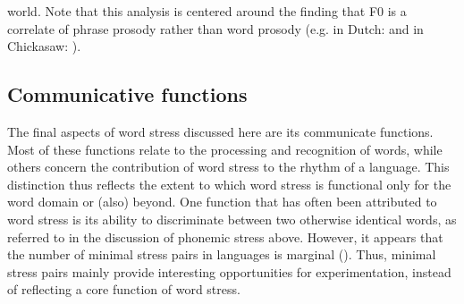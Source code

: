 world. Note that this analysis is centered around the finding that F0 is a correlate of phrase prosody rather than word prosody (e.g. in Dutch: \citealt{sluijter_spectral_1996} and in Chickasaw: \citealt{gordon_intonational_2005}).

\subsection{Communicative functions} \label{sec114}
The final aspects of word stress discussed here are its communicate functions. Most of these functions relate to the processing and recognition of words, while others concern the contribution of word stress to the rhythm of a language. This distinction thus reflects the extent to which word stress is functional only for the word domain or (also) beyond. One function that has often been attributed to word stress is its ability to discriminate between two otherwise identical words, as referred to in the discussion of phonemic stress above. However, it appears that the number of minimal stress pairs in languages is marginal (\citealt{cutler_lexical_2005}). Thus, minimal stress pairs mainly provide interesting opportunities for experimentation, instead of reflecting a core function of word stress.

